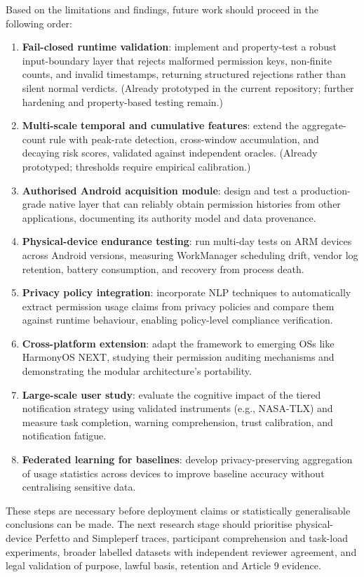 Based on the limitations and findings, future work should proceed in the following order:

\begin{enumerate}
    \item \textbf{Fail-closed runtime validation}: implement and property-test a robust input-boundary layer that rejects malformed permission keys, non-finite counts, and invalid timestamps, returning structured rejections rather than silent normal verdicts. (Already prototyped in the current repository; further hardening and property-based testing remain.)
    \item \textbf{Multi-scale temporal and cumulative features}: extend the aggregate-count rule with peak-rate detection, cross-window accumulation, and decaying risk scores, validated against independent oracles. (Already prototyped; thresholds require empirical calibration.)
    \item \textbf{Authorised Android acquisition module}: design and test a production-grade native layer that can reliably obtain permission histories from other applications, documenting its authority model and data provenance.
    \item \textbf{Physical-device endurance testing}: run multi-day tests on ARM devices across Android versions, measuring WorkManager scheduling drift, vendor log retention, battery consumption, and recovery from process death.
    \item \textbf{Privacy policy integration}: incorporate NLP techniques to automatically extract permission usage claims from privacy policies and compare them against runtime behaviour, enabling policy-level compliance verification.
    \item \textbf{Cross-platform extension}: adapt the framework to emerging OSs like HarmonyOS NEXT, studying their permission auditing mechanisms and demonstrating the modular architecture's portability.
    \item \textbf{Large-scale user study}: evaluate the cognitive impact of the tiered notification strategy using validated instruments (e.g., NASA-TLX) and measure task completion, warning comprehension, trust calibration, and notification fatigue.
    \item \textbf{Federated learning for baselines}: develop privacy-preserving aggregation of usage statistics across devices to improve baseline accuracy without centralising sensitive data.
\end{enumerate}

These steps are necessary before deployment claims or statistically generalisable conclusions can be made. The next research stage should prioritise physical-device Perfetto and Simpleperf traces, participant comprehension and task-load experiments, broader labelled datasets with independent reviewer agreement, and legal validation of purpose, lawful basis, retention and Article 9 evidence.